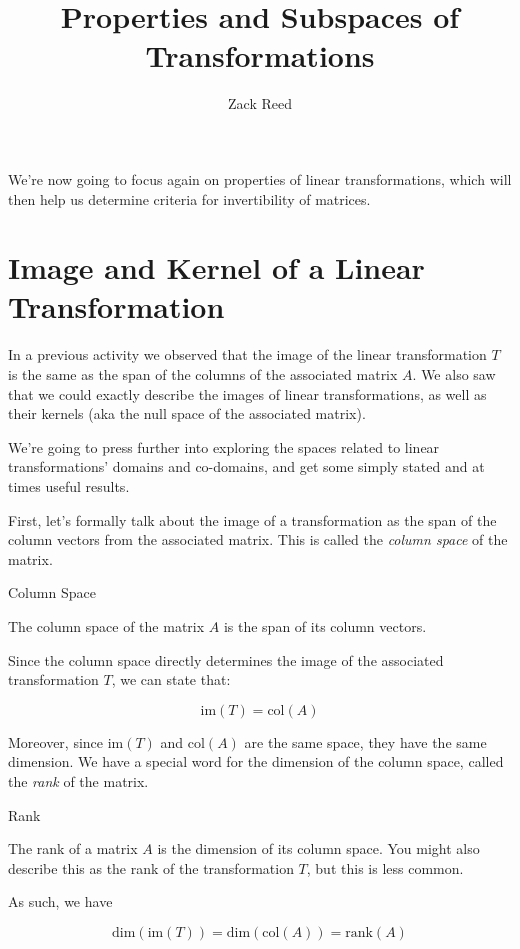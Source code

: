 \documentclass{ximera}
\author{Zack Reed}
\title{Properties and Subspaces of Transformations}\license{CC BY-NC-SA 4.0}
\begin{document}
\begin{abstract}

\end{abstract}
\maketitle

We're now going to focus again on properties of linear transformations, which will then help us determine criteria for invertibility of matrices.

\section*{Image and Kernel of a Linear Transformation}

In a previous activity we observed that the image of the linear transformation $T$ is the same as the span of the columns of the associated matrix $A$. We also saw that we could exactly describe the images of linear transformations, as well as their kernels (aka the null space of the associated matrix).

We're going to press further into exploring the spaces related to linear transformations' domains and co-domains, and get some simply stated and at times useful results.

First, let's formally talk about the image of a transformation as the span of the column vectors from the associated matrix. This is called the \emph{column space} of the matrix.

\begin{definition}{Column Space}

The column space of the matrix $A$ is the span of its column vectors.

Since the column space directly determines the image of the associated transformation $T$, we can state that:

$$\mbox{im}(T)=\mbox{col}(A)$$
\end{definition}

Moreover, since $\mbox{im}(T)$ and $\mbox{col}(A)$ are the same space, they have the same dimension. We have a special word for the dimension of the column space, called the \emph{rank} of the matrix. 

\begin{definition}{Rank}

  The rank of a matrix $A$ is the dimension of its column space. You might also describe this as the rank of the transformation $T$, but this is less common. 

  As such, we have

$$\mbox{dim}(\mbox{im}(T))=\mbox{dim}(\mbox{col}(A))=\mbox{rank}(A)$$
\end{definition}
 
\end{document}
